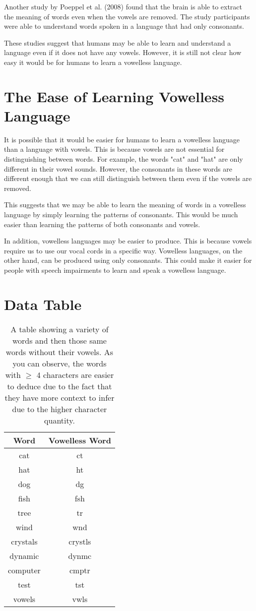 \documentclass{article}
\begin{document}
Another study by Poeppel et al. (2008) found that the brain is able to extract the meaning of words even when the vowels are removed. The study participants were able to understand words spoken in a language that had only consonants.

These studies suggest that humans may be able to learn and understand a language even if it does not have any vowels. However, it is still not clear how easy it would be for humans to learn a vowelless language.

\section{The Ease of Learning Vowelless Language}

It is possible that it would be easier for humans to learn a vowelless language than a language with vowels. This is because vowels are not essential for distinguishing between words. For example, the words "cat" and "hat" are only different in their vowel sounds. However, the consonants in these words are different enough that we can still distinguish between them even if the vowels are removed.

This suggests that we may be able to learn the meaning of words in a vowelless language by simply learning the patterns of consonants. This would be much easier than learning the patterns of both consonants and vowels.

In addition, vowelless languages may be easier to produce. This is because vowels require us to use our vocal cords in a specific way. Vowelless languages, on the other hand, can be produced using only consonants. This could make it easier for people with speech impairments to learn and speak a vowelless language.

\section{Data Table}
\begin{table}[ht]
\centering
\begin{tabular}{||c|c||}
\hline
Word & Vowelless Word \\
\hline
\hline
cat & ct \\
hat & ht \\
dog & dg \\
fish & fsh \\
tree & tr \\
wind & wnd \\
crystals & crystls \\
dynamic & dynmc \\
computer & cmptr \\
test & tst \\
vowels & vwls \\
\hline
\end{tabular}
\caption{A table showing a variety of words and then those same words without their vowels. As you can observe, the words with $\geq$ 4 characters are easier to deduce due to the fact that they have more context to infer due to the higher character quantity. }
\end{table}
\end{document}
